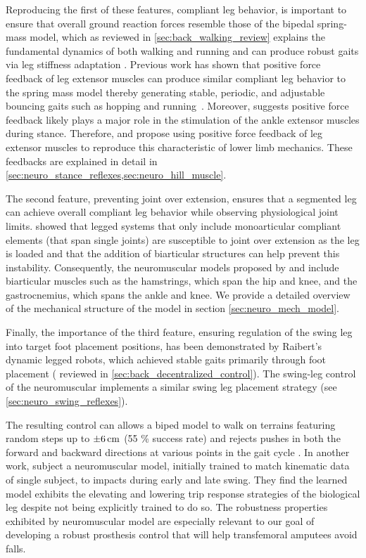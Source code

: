 Reproducing the first of these features, compliant leg behavior, is important
to ensure that overall ground reaction forces resemble those of the bipedal
spring-mass model, which as reviewed in \cref{sec:back_walking_review} explains
the fundamental dynamics of both walking and running \citep{geyer2006compliant}
and can produce robust gaits via leg stiffness adaptation
\citep{visser2012robust}. Previous work has shown that positive force feedback
of leg extensor muscles can produce similar compliant leg behavior to the spring
mass model thereby generating stable, periodic, and adjustable bouncing gaits
such as hopping and running~\citep{geyer2003positive}. Moreover,
\citet{grey2007positive} suggests positive force feedback likely plays a major
role in the stimulation of the ankle extensor muscles during stance. Therefore,
\citeauthor{geyer2010muscle} and \citeauthor{song2015neural} propose using
positive force feedback of leg extensor muscles to reproduce this characteristic
of lower limb mechanics. These feedbacks are explained in detail in
\cref{sec:neuro_stance_reflexes,sec:neuro_hill_muscle}.

The second feature, preventing joint over extension, ensures that a segmented
leg can achieve overall compliant leg behavior while observing physiological
joint limits. \citet{seyfarth2001stable} showed that legged systems that only
include monoarticular compliant elements (that span single joints) are
susceptible to joint over extension as the leg is loaded and that the addition
of biarticular structures can help prevent this instability. Consequently, the
neuromuscular models proposed by \citet{geyer2010muscle} and
\citet{song2015neural} include biarticular muscles such as the hamstrings, which
span the hip and knee, and the gastrocnemius, which spans the ankle and knee.
We provide a detailed overview of the mechanical structure of the model in
section \cref{sec:neuro_mech_model}.

Finally, the importance of the third feature, ensuring regulation of the swing
leg into target foot placement positions, has been demonstrated by Raibert's
dynamic legged robots, which achieved stable gaits primarily through foot
placement (\citep{raibert1983dynamically,raibert1986legged} reviewed in
\cref{sec:back_decentralized_control}). The swing-leg control of the
neuromuscular implements a similar swing leg placement strategy (see
\cref{sec:neuro_swing_reflexes}).

The resulting control can allows a biped model to walk on terrains featuring
random steps up to $\unit[\pm 6]{cm}$ (55 \% success rate) and rejects pushes in
both the forward and backward directions at various points in the gait cycle
\citep{song2015neural}. In another work, \citet{murai2011neuromuscular} subject
a neuromuscular model, initially trained to match kinematic data of single
subject, to impacts during early and late swing. They find the learned model
exhibits the elevating and lowering trip response strategies of the biological
leg despite not being explicitly trained to do so. The robustness properties
exhibited by neuromuscular model are especially relevant to our goal of
developing a robust prosthesis control that will help transfemoral amputees
avoid falls. 

